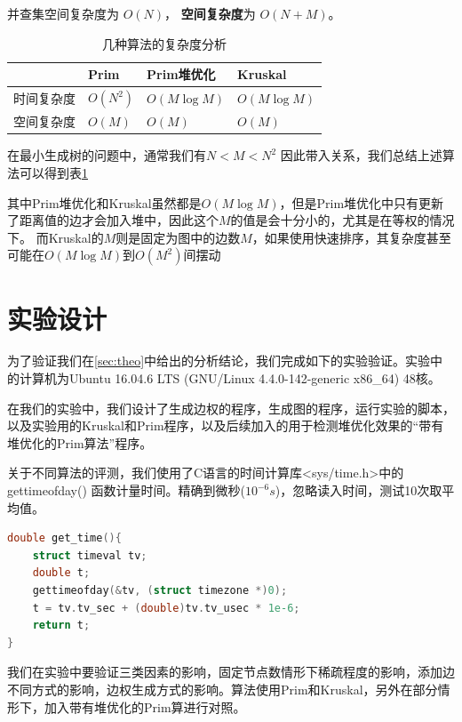 \documentclass[UTF8]{ctexart}
\begin{document}
并查集空间复杂度为 $O(N)$， \textbf{空间复杂度}为 $O(N+M)$。

\begin{table}[htbp]
    \centering
    \begin{tabular}{|l|l|l|l|}
    \hline
          & Prim & Prim堆优化 & Kruskal \\ \hline
    时间复杂度 &  $O(N^2)$    &     $O(M\log M)$    &     $O(M\log M)$    \\ \hline
    空间复杂度 &  $O(M)$      &     $O(M)$          &     $O(M)$          \\ \hline
    \end{tabular}
    \caption{几种算法的复杂度分析}
    \label{tab:comp}
\end{table}

在最小生成树的问题中，通常我们有$N<M<N^2$ 因此带入关系，我们总结上述算法可以得到表\ref{tab:comp}




其中Prim堆优化和Kruskal虽然都是$O(M\log M)$，但是Prim堆优化中只有更新了距离值的边才会加入堆中，因此这个$M$的值是会十分小的，尤其是在等权的情况下。
而Kruskal的$M$则是固定为图中的边数$M$，如果使用快速排序，其复杂度甚至可能在$O(M\log M)$到$O(M^2)$间摆动


\section{实验设计}\label{ss:design}
为了验证我们在\ref{sec:theo}中给出的分析结论，我们完成如下的实验验证。实验中的计算机为Ubuntu 16.04.6 LTS (GNU/Linux 4.4.0-142-generic x86\_64) 48核。

在我们的实验中，我们设计了生成边权的程序，生成图的程序，运行实验的脚本，以及实验用的Kruskal和Prim程序，以及后续加入的用于检测堆优化效果的“带有堆优化的Prim算法”程序。

关于不同算法的评测，我们使用了C语言的时间计算库<sys/time.h>中的gettimeofday() 函数计量时间。精确到微秒(\(10^{-6}s\))，忽略读入时间，测试10次取平均值。

\begin{lstlisting}[language=c]
double get_time(){
	struct timeval tv;
	double t;
	gettimeofday(&tv, (struct timezone *)0);
	t = tv.tv_sec + (double)tv.tv_usec * 1e-6;
	return t;
}
\end{lstlisting}

我们在实验中要验证三类因素的影响，固定节点数情形下稀疏程度的影响，添加边不同方式的影响，边权生成方式的影响。算法使用Prim和Kruskal，另外在部分情形下，加入带有堆优化的Prim算进行对照。
\end{document}
